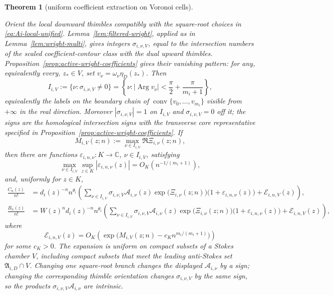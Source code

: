 \documentclass[reqno]{article}
\newtheorem{theorem}{Theorem}
\theoremstyle{definition}
\theoremstyle{remark}
\theoremstyle{plain}
\newcommand{\C}{\mathbb C}
\begin{document}
\begin{theorem}[uniform coefficient extraction on Voronoi cells]
\begin{enumerate}
Orient the local downward thimbles compatibly with the square-root choices in \eqref{eq:Ai-local-unified}. Lemma~\ref{lem:filtered-wright}, applied as in Lemma~\ref{lem:wright-multi}, gives integers $\sigma_{i,\nu,V}$, equal to the intersection numbers of the scaled coefficient-contour class with the dual upward thimbles. Proposition~\ref{prop:active-wright-coefficients} gives their vanishing pattern: for any, equivalently every, $z_\ast\in V$, set $v_\nu=\omega_\nu\eta_D(z_\ast)$. Then
\[
I_{i,V}:=\{\nu:\sigma_{i,\nu,V}\ne0\}
=\left\{\nu:
\left|\operatorname{Arg} v_\nu\right|<
\frac\pi2+\frac\pi{m_i+1}\right\},
\]
equivalently the labels on the boundary chain of $\operatorname{conv}\{v_0,
\ldots,v_{m_i}\}$ visible from $+\infty$ in the real direction. Moreover $|\sigma_{i,\nu,V}|=1$ on $I_{i,V}$ and $\sigma_{i,\nu,V}=0$ off it; the signs are the homological intersection signs with the transverse core representative specified in Proposition~\ref{prop:active-wright-coefficients}. If
$$M_{i,V}(z;n):=\max_{\nu\in I_{i,V}}\Re\Xi_{i,\nu}(z;n),$$
then there are functions $\varepsilon_{i,n,\nu}:K\to\C$, $\nu\in I_{i,V}$, satisfying
$$\max_{\nu\in I_{i,V}}\sup_{z\in K}|\varepsilon_{i,n,\nu}(z)|=O_K\!\left(n^{-1/(m_i+1)}\right),$$
and, uniformly for $z\in K$,
\begin{align}
\frac{C_n(z)}{n!}
&=d_i(z)^{-n}n^{\theta_i}
\left(
\sum_{\nu\in I_{i,V}}\sigma_{i,\nu,V}\mathcal A_{i,\nu}(z)\exp\!\bigl(\Xi_{i,\nu}(z;n)\bigr)\bigl(1+\varepsilon_{i,n,\nu}(z)\bigr)+\mathcal E_{i,n,V}(z)
\right),\label{eq:Cn-local-unified-essential}\\
\frac{B_n(z)}{n!}
&=W(z)^n d_i(z)^{-n}n^{\theta_i}
\left(
\sum_{\nu\in I_{i,V}}\sigma_{i,\nu,V}\mathcal A_{i,\nu}(z)\exp\!\bigl(\Xi_{i,\nu}(z;n)\bigr)\bigl(1+\varepsilon_{i,n,\nu}(z)\bigr)+\mathcal E_{i,n,V}(z)
\right),\label{eq:Bn-local-unified-essential}
\end{align}
where
\begin{equation}\label{eq:R-local-unified-essential}
\mathcal E_{i,n,V}(z)=
O_K\!\left(
\exp\!\bigl(M_{i,V}(z;n)-c_K n^{m_i/(m_i+1)}\bigr)
\right)
\end{equation}
for some $c_K>0$. The expansion is uniform on compact subsets of a Stokes chamber $V$, including compact subsets that meet the leading anti-Stokes set $\mathfrak A_{i,D}\cap V$. Changing one square-root branch changes the displayed $\mathcal A_{i,\nu}$ by a sign; changing the corresponding thimble orientation changes $\sigma_{i,\nu,V}$ by the same sign, so the products $\sigma_{i,\nu,V}\mathcal A_{i,\nu}$ are intrinsic.
\end{enumerate}
\end{theorem}
\end{document}
